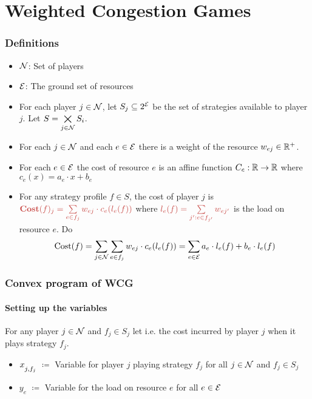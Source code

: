 \documentclass[aspectratio=1610]{beamer}
\begin{document}
\section{Weighted Congestion Games}
\begin{frame}
	\frametitle{Definitions}
	\begin{itemize}
		\item $\mathcal{N}$: Set of players
		\item $\mathcal{E}$: The ground set of resources
		\item For each player $j \in \mathcal{N}$, let $S_j\subseteq 2^{\mathcal{E}}$ be the set of strategies available to player $j$. Let $S=\bigtimes\limits_{j\in\mathcal{N}}S_i$.
		\item For each $j\in \mathcal{N}$ and each $e\in \mathcal{E}$ there is a weight of the resource $w_{ej}\in\mathbb{R}^+$.
		\item For each $e\in \mathcal{E}$ the cost of resource $e$ is an affine function $C_e:\mathbb{R}\to\mathbb{R}$ where $c_e(x)=a_e\cdot x+b_e$
		\item For any strategy profile $f\in S$, the cost of player $j$ is $\mathcolor{myr}{\textbf{Cost}(f)_j=\sum\limits_{e\in f_j}w_{ej}\cdot c_e(l_e(f))}$ where $\mathcolor{myr}{l_e(f)=\sum\limits_{j':e\in f_{j'}}w_{ej'}}$ is the load on resource $e$. Do $$\text{Cost}(f)=\sum_{j\in\mathcal{N}}\sum_{e\in f_j}w_{ej}\cdot c_e(l_e(f))=\sum_{e\in\mathcal{E}}a_e\cdot l_e(f)+b_e\cdot l_e(f)$$
	\end{itemize}
\end{frame}
\begin{frame}
    \frametitle{Convex program of WCG}

	\framesubtitle{Setting up the variables}
	For any player $j\in\mathcal{N}$ and $f_j\in S_j$ let          \only<1>{
		\(
		\color{myr}{L\st_{j,f_j} = \sum\limits_{e \in f_j} w_{ej} \cdot c_e(w_{ej})}
		\)
	}
	i.e. the cost incurred by player $j$ when it plays strategy $f_j$.\pause

	\begin{itemize}[itemsep=2em, topsep=2em]
		\item $x\strut_{j,f_j}$  $\coloneqq$ Variable for player $j$ playing strategy $f_j$ for all $j\in\mathcal{N}$ and $f_j\in S_j$\pause

		\item $y_e$ $\coloneqq$ Variable for the load on resource $e$ for all $e\in\mathcal{E}$
	\end{itemize}
\end{frame}
\end{document}
